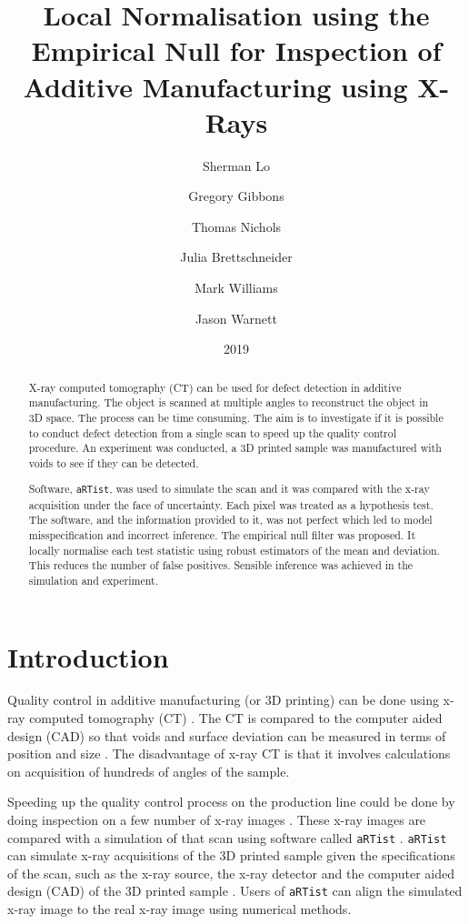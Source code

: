 \documentclass[twocolumn]{article}
\title{Local Normalisation using the Empirical Null for Inspection of Additive Manufacturing using X-Rays}
\date{2019}
\author{
  Sherman Lo \and Gregory Gibbons \and Thomas Nichols \and Julia Brettschneider \and Mark Williams \and Jason Warnett
}
\begin{document}
\sloppy

\maketitle

\begin{abstract}
X-ray computed tomography (CT) can be used for defect detection in additive manufacturing. The object is scanned at multiple angles to reconstruct the object in 3D space. The process can be time consuming. The aim is to investigate if it is possible to conduct defect detection from a single scan to speed up the quality control procedure. An experiment was conducted, a 3D printed sample was manufactured with voids to see if they can be detected.

Software, \texttt{aRTist}, was used to simulate the scan and it was compared with the x-ray acquisition under the face of uncertainty. Each pixel was treated as a hypothesis test. The software, and the information provided to it, was not perfect which led to model misspecification and incorrect inference. The empirical null filter was proposed. It locally normalise each test statistic using robust estimators of the mean and deviation. This reduces the number of false positives. Sensible inference was achieved in the simulation and experiment.
\end{abstract}

\section{Introduction}

Quality control in additive manufacturing (or 3D printing) can be done using x-ray computed tomography (CT) \citep{thompson2016x}. The CT is compared to the computer aided design (CAD) so that voids and surface deviation can be measured in terms of position and size \citep{villarraga2015assessing, lee2015compliance, kim2016inspection}. The disadvantage of x-ray CT is that it involves calculations on acquisition of hundreds of angles of the sample.

Speeding up the quality control process on the production line could be done by doing inspection on a few number of x-ray images \citep{warnett2016towards}. These x-ray images are compared with a simulation of that scan using software called \texttt{aRTist} \citep{bellon2007artist, jaenisch2008artist, bellon2012radiographic}. \texttt{aRTist} can simulate x-ray acquisitions of the 3D printed sample given the specifications of the scan, such as the x-ray source, the x-ray detector and the computer aided design (CAD) of the 3D printed sample \citep{bellon2011simulation, deresch2012simulating}. Users of \texttt{aRTist} can align the simulated x-ray image to the real x-ray image using numerical methods.
\end{document}
